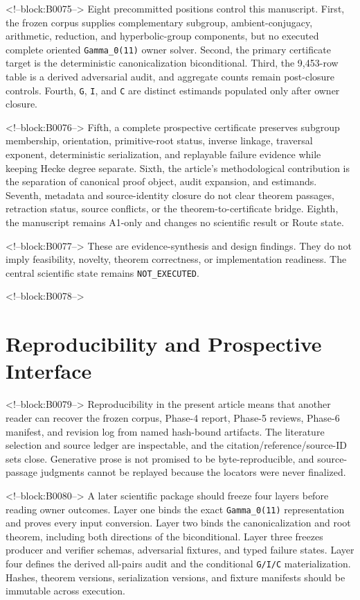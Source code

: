 \documentclass[11pt]{article}
\begin{document}
<!--block:B0075-->
Eight precommitted positions control this manuscript. First, the frozen
corpus supplies complementary subgroup, ambient-conjugacy, arithmetic,
reduction, and hyperbolic-group components, but no executed complete
oriented \texttt{Gamma\_0(11)} owner solver. Second, the primary
certificate target is the deterministic canonicalization biconditional.
Third, the 9,453-row table is a derived adversarial audit, and aggregate
counts remain post-closure controls. Fourth, \texttt{G}, \texttt{I}, and
\texttt{C} are distinct estimands populated only after owner closure.

<!--block:B0076-->
Fifth, a complete prospective certificate preserves subgroup membership,
orientation, primitive-root status, inverse linkage, traversal exponent,
deterministic serialization, and replayable failure evidence while
keeping Hecke degree separate. Sixth, the article's methodological
contribution is the separation of canonical proof object, audit
expansion, and estimands. Seventh, metadata and source-identity closure
do not clear theorem passages, retraction status, source conflicts, or
the theorem-to-certificate bridge. Eighth, the manuscript remains A1-only
and changes no scientific result or Route state.

<!--block:B0077-->
These are evidence-synthesis and design findings. They do not imply
feasibility, novelty, theorem correctness, or implementation readiness.
The central scientific state remains \texttt{NOT\_EXECUTED}.

<!--block:B0078-->
\hypertarget{6-reproducibility-and-prospective-interface}{%
\section{Reproducibility and Prospective
Interface}\label{6-reproducibility-and-prospective-interface}}

<!--block:B0079-->
Reproducibility in the present article means that another reader can
recover the frozen corpus, Phase-4 report, Phase-5 reviews, Phase-6
manifest, and revision log from named hash-bound artifacts. The
literature selection and source ledger are inspectable, and the
citation/reference/source-ID sets close. Generative prose is not
promised to be byte-reproducible, and source-passage judgments cannot be
replayed because the locators were never finalized.

<!--block:B0080-->
A later scientific package should freeze four layers before reading
owner outcomes. Layer one binds the exact \texttt{Gamma\_0(11)}
representation and proves every input conversion. Layer two binds the
canonicalization and root theorem, including both directions of the
biconditional. Layer three freezes producer and verifier schemas,
adversarial fixtures, and typed failure states. Layer four defines the
derived all-pairs audit and the conditional \texttt{G/I/C}
materialization. Hashes, theorem versions, serialization versions, and
fixture manifests should be immutable across execution.
\end{document}
